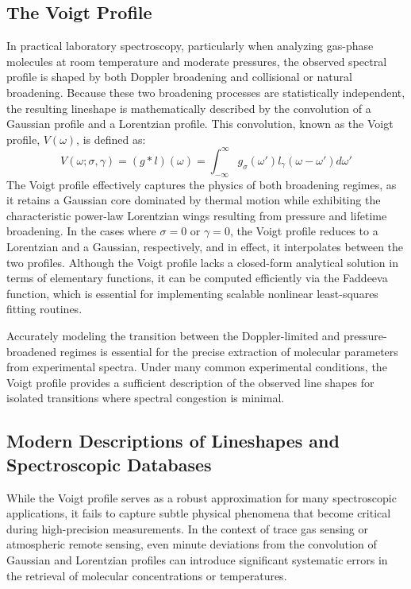 \documentclass[8pt,a4paper]{report}
\begin{document}
	\subsection{The Voigt Profile}
	In practical laboratory spectroscopy, particularly when analyzing gas-phase molecules at room temperature and moderate pressures, the observed spectral profile is shaped by both Doppler broadening and collisional or natural broadening. Because these two broadening processes are statistically independent, the resulting lineshape is mathematically described by the convolution of a Gaussian profile and a Lorentzian profile. This convolution, known as the Voigt profile, $V(\omega)$, is defined as:
	\begin{equation}
		V(\omega; \sigma, \gamma) = (g * l)(\omega) = \int_{-\infty}^{\infty} g_\sigma(\omega') l_\gamma(\omega - \omega') d\omega'
	\end{equation}
	The Voigt profile effectively captures the physics of both broadening regimes, as it retains a Gaussian core dominated by thermal motion while exhibiting the characteristic power-law Lorentzian wings resulting from pressure and lifetime broadening. In the cases where $\sigma=0$ or $\gamma=0$, the Voigt profile reduces to a Lorentzian and a Gaussian, respectively, and in effect, it interpolates between the two profiles. Although the Voigt profile lacks a closed-form analytical solution in terms of elementary functions, it can be computed efficiently via the Faddeeva function, which is essential for implementing scalable nonlinear least-squares fitting routines.
	
	Accurately modeling the transition between the Doppler-limited and pressure-broadened regimes is essential for the precise extraction of molecular parameters from experimental spectra. Under many common experimental conditions, the Voigt profile provides a sufficient description of the observed line shapes for isolated transitions where spectral congestion is minimal.
	
	\subsection{Modern Descriptions of Lineshapes and Spectroscopic Databases}
	While the Voigt profile serves as a robust approximation for many spectroscopic applications, it fails to capture subtle physical phenomena that become critical during high-precision measurements. In the context of trace gas sensing or atmospheric remote sensing, even minute deviations from the convolution of Gaussian and Lorentzian profiles can introduce significant systematic errors in the retrieval of molecular concentrations or temperatures.
	
\end{document}
